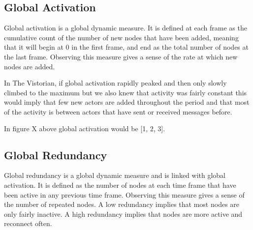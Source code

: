 




\subsection{Global Activation}
Global activation is a global dynamic measure. It is defined at each frame as the cumulative count of the number of new nodes that have been added, meaning that it will begin at 0 in the first frame, and end as the total number of nodes at the last frame. Observing this measure gives a sense of the rate at which new nodes are added. 

In The Vistorian, if global activation rapidly peaked and then only slowly climbed to the maximum but we also knew that activity was fairly constant this would imply that few new actors are added throughout the period and that most of the activity is between actors that have sent or received messages before.

In figure X above global activation would be [1, 2, 3].




\subsection{Global Redundancy}
Global redundancy is a global dynamic measure and is linked with global activation. It is defined as the number of nodes at each time frame that have been active in any previous time frame. Observing this measure gives a sense of the number of repeated nodes. A low redundancy implies that most nodes are only fairly inactive. A high redundancy implies that nodes are more active and reconnect often.

